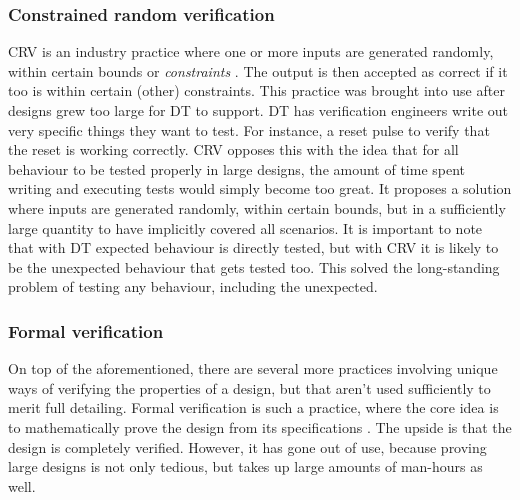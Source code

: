 \documentclass[11pt,british]{article}
\begin{document}
\subsubsection{Constrained random verification}
\gls{CRV} is an industry practice where one or more inputs are generated randomly, within certain bounds or \emph{constraints} \cite{crv1,crv2}. The output is then accepted as correct if it too is within certain (other) constraints. This practice was brought into use after designs grew too large for \gls{DT} to support. DT has verification engineers write out very specific things they want to test. For instance, a reset pulse to verify that the reset is working correctly. CRV opposes this with the idea that for all behaviour to be tested properly in large designs, the amount of time spent writing and executing tests would simply become too great. It proposes a solution where inputs are generated randomly, within certain bounds, but in a sufficiently large quantity to have implicitly covered all scenarios. It is important to note that with DT expected behaviour is directly tested, but with CRV it is likely to be the unexpected behaviour that gets tested too. This solved the long-standing problem of testing any behaviour, including the unexpected.

\subsubsection{Formal verification}
On top of the aforementioned, there are several more practices involving unique ways of verifying the properties of a design, but that aren't used sufficiently to merit full detailing. Formal verification is such a practice, where the core idea is to mathematically prove the design from its specifications \cite{assertformal,formal}. The upside is that the design is completely verified. However, it has gone out of use, because proving large designs is not only tedious, but takes up large amounts of man-hours as well.

\end{document}
